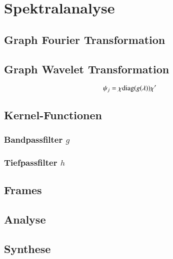 \section{Spektralanalyse}

\subsection{Graph Fourier Transformation\label{subsec:sgwt:gft}}

\subsection{Graph Wavelet Transformation\label{subsec:sgwt:gwt}}

\begin{equation}
\psi_j = \chi \diag{g(\lambda)} \chi'
\end{equation}

\subsection{Kernel-Functionen}

\subsubsection{Bandpassfilter \texorpdfstring{$g$}{g}}

\subsubsection{Tiefpassfilter \texorpdfstring{$h$}{h}}

\subsection{Frames}

\subsection{Analyse}

\subsection{Synthese}
